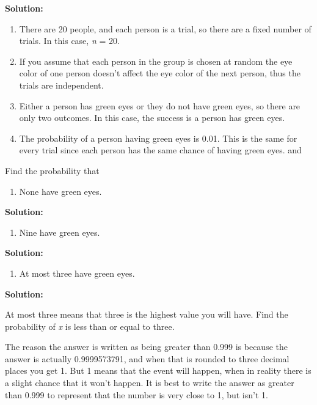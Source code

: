 \documentclass[]{book}
\providecommand{\tightlist}{%
  \setlength{\itemsep}{0pt}\setlength{\parskip}{0pt}}
\begin{document}
\textbf{Solution:}

\begin{enumerate}
\def\labelenumi{\arabic{enumi}.}
\item
  There are 20 people, and each person is a trial, so there are a
  fixed number of trials. In this case, \emph{n} = 20.
\item
  If you assume that each person in the group is chosen at random the
  eye color of one person doesn't affect the eye color of the next
  person, thus the trials are independent.
\item
  Either a person has green eyes or they do not have green eyes, so
  there are only two outcomes. In this case, the success is a person
  has green eyes.
\item
  The probability of a person having green eyes is 0.01. This is the
  same for every trial since each person has the same chance of having
  green eyes. and
\end{enumerate}

Find the probability that

\begin{enumerate}
\def\labelenumi{\alph{enumi}.}
\setcounter{enumi}{2}
\tightlist
\item
  None have green eyes.
\end{enumerate}

\textbf{Solution:}

\begin{enumerate}
\def\labelenumi{\alph{enumi}.}
\setcounter{enumi}{3}
\tightlist
\item
  Nine have green eyes.
\end{enumerate}

\textbf{Solution:}

\begin{enumerate}
\def\labelenumi{\alph{enumi}.}
\setcounter{enumi}{4}
\tightlist
\item
  At most three have green eyes.
\end{enumerate}

\textbf{Solution:}

At most three means that three is the highest value you will have. Find
the probability of \emph{x} is less than or equal to three.

The reason the answer is written as being greater than 0.999 is because
the answer is actually 0.9999573791, and when that is rounded to three
decimal places you get 1. But 1 means that the event will happen, when
in reality there is a slight chance that it won't happen. It is best to
write the answer as greater than 0.999 to represent that the number is
very close to 1, but isn't 1.
\end{document}
